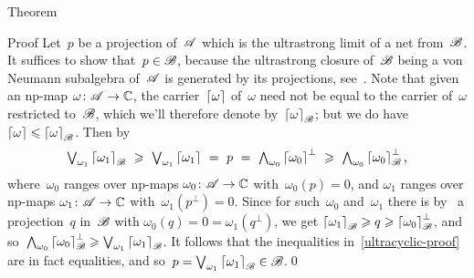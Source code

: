 \documentclass[a]{subfiles}
\begin{document}
\begin{parsec}
\begin{point}[vnsac]{Theorem}
\begin{point}{Proof}
Let~$p$ be a projection of~$\mathscr{A}$ which is the ultrastrong limit
of a net from~$\mathscr{B}$. It suffices to show that~$p\in\mathscr{B}$,
because the ultrastrong closure of~$\mathscr{B}$
being a von Neumann subalgebra of~$\mathscr{A}$
is generated by its projections, see~.
Note that given an np-map $\omega\colon \mathscr{A}\to\mathbb{C}$,
the carrier~$\left\lceil\omega\right\rceil$ of~$\omega$
need not be equal to the carrier
of~$\omega$ restricted to~$\mathscr{B}$,
which we'll therefore denote by~$\left\lceil\omega\right\rceil_{\mathscr{B}}$;
but we do have $\left\lceil\omega\right\rceil\leqslant \left\lceil\omega\right\rceil_{\mathscr{B}}$.
Then by~
\begin{equation}
\label{ultracyclic-proof}
\textstyle
\bigvee_{\omega_1}
\ceil{\omega_1}_\scrB \ \geq\ 
\bigvee_{\omega_1}
\ceil{\omega_1}\ =\ p\ =\ 
\bigwedge_{\omega_0} \ceil{\omega_0}^\perp
\ \geq\ \bigwedge_{\omega_0} \ceil{\omega_0}_{\scrB}^\perp,
\end{equation}
where~$\omega_0$ ranges over np-maps $\omega_0\colon \mathscr{A}\to\mathbb{C}$
with~$\omega_0(p)=0$,
 and $\omega_1$ ranges over
np-maps $\omega_1\colon \mathscr{A}\to\mathbb{C}$ with~$\omega_1(p^\perp)=0$.
Since for such~$\omega_0$ and~$\omega_1$
there is 
by~
a projection~$q$ in~$\mathscr{B}$
with $\omega_0(q)=0=\omega_1(q^\perp)$,
we get 
$\left\lceil\omega_1\right\rceil_{\mathscr{B}} \geqslant q \geqslant 
\left\lceil\omega_0\right\rceil_{\mathscr{B}}^\perp$,
and so~$\bigwedge_{\omega_0} \left\lceil\omega_0\right\rceil_{\mathscr{B}}^\perp 
\geqslant \bigvee_{\omega_1} \left\lceil\omega_1\right\rceil_{\mathscr{B}}$.
It follows that the inequalities in~\eqref{ultracyclic-proof}
are in fact equalities,
and so~$p=\bigvee_{\omega_1}\left\lceil\omega_1\right\rceil_{\mathscr{B}} \in \mathscr{B}$.\qed
\end{point}
\end{point}
\end{parsec}
\end{document}
